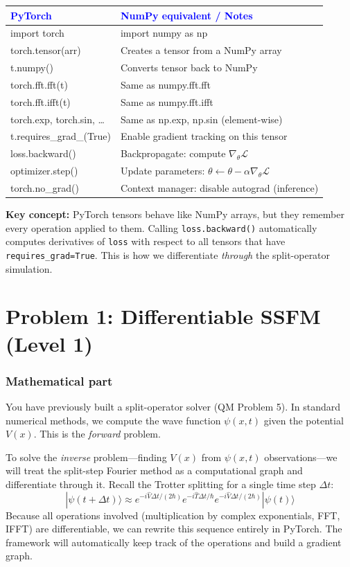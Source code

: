 \documentclass[11pt]{article}
\begin{document}
\begin{center}
\renewcommand{\arraystretch}{1.3}
\begin{tabularx}{\textwidth}{@{} >{\ttfamily\small}l X @{}}
\toprule
\textcolor{blue}{PyTorch} & \textcolor{blue}{NumPy equivalent / Notes} \\ \midrule
import torch & import numpy as np \\
torch.tensor(arr) & Creates a tensor from a NumPy array \\
t.numpy() & Converts tensor back to NumPy \\
torch.fft.fft(t) & Same as numpy.fft.fft \\
torch.fft.ifft(t) & Same as numpy.fft.ifft \\
torch.exp, torch.sin, \ldots & Same as np.exp, np.sin (element-wise) \\
t.requires\_grad\_(True) & Enable gradient tracking on this tensor \\
loss.backward() & Backpropagate: compute $\nabla_\theta \mathcal{L}$ \\
optimizer.step() & Update parameters: $\theta \leftarrow \theta - \alpha \nabla_\theta \mathcal{L}$ \\
torch.no\_grad() & Context manager: disable autograd (inference) \\
\bottomrule
\end{tabularx}
\end{center}

\textbf{Key concept:} PyTorch tensors behave like NumPy arrays, but they remember every operation applied to them. Calling \lstinline|loss.backward()| automatically computes derivatives of \lstinline|loss| with respect to all tensors that have \lstinline|requires_grad=True|. This is how we differentiate \emph{through} the split-operator simulation.


\section*{Problem 1: Differentiable SSFM (Level 1)}

\subsubsection*{Mathematical part}
You have previously built a split-operator solver (QM Problem 5). In standard numerical methods, we compute the wave function $\psi(x,t)$ given the potential $V(x)$. This is the \emph{forward} problem. 

To solve the \emph{inverse} problem---finding $V(x)$ from $\psi(x,t)$ observations---we will treat the split-step Fourier method as a computational graph and differentiate through it. 
Recall the Trotter splitting for a single time step $\Delta t$:
$$
|\psi(t + \Delta t)\rangle \approx e^{-i\hat{V}\Delta t/(2\hbar)} e^{-i\hat{T}\Delta t/\hbar} e^{-i\hat{V}\Delta t/(2\hbar)} |\psi(t)\rangle
$$
Because all operations involved (multiplication by complex exponentials, FFT, IFFT) are differentiable, we can rewrite this sequence entirely in PyTorch. The framework will automatically keep track of the operations and build a gradient graph.
\end{document}

